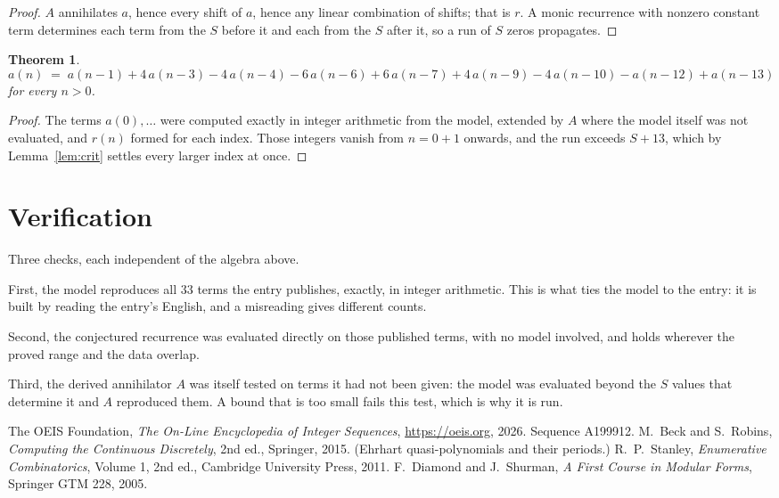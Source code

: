 \documentclass[11pt,a4paper]{article}
\theoremstyle{plain}
\newtheorem{theorem}{Theorem}
\theoremstyle{definition}
\begin{document}
\begin{proof}
$A$ annihilates $a$, hence every shift of $a$, hence any linear combination of shifts; that is
$r$. A monic recurrence with nonzero constant term determines each term from the $S$ before it
and each from the $S$ after it, so a run of $S$ zeros propagates.
\end{proof}

\begin{theorem}
\[
a(n)\;=\;a(n-1) + 4\,a(n-3) - 4\,a(n-4) - 6\,a(n-6) + 6\,a(n-7) + 4\,a(n-9) - 4\,a(n-10) - a(n-12) + a(n-13)
\]
for every $n>0$.
\end{theorem}

\begin{proof}
The terms $a(0),\dots$ were computed exactly in integer arithmetic from the model, extended by
$A$ where the model itself was not evaluated, and $r(n)$ formed for each index. Those integers
vanish from $n=0+1$ onwards, and the run exceeds $S+13$, which by
Lemma~\ref{lem:crit} settles every larger index at once.
\end{proof}

\section{Verification}

Three checks, each independent of the algebra above.

First, the model reproduces all $33$ terms the entry publishes, exactly, in integer
arithmetic. This is what ties the model to the entry: it is built by reading the entry's
English, and a misreading gives different counts.

Second, the conjectured recurrence was evaluated directly on those published terms, with no
model involved, and holds wherever the proved range and the data overlap.

Third, the derived annihilator $A$ was itself tested on terms it had not been given: the model
was evaluated beyond the $S$ values that determine it and $A$ reproduced them. A bound that is
too small fails this test, which is why it is run.

\begin{thebibliography}{9}
 The OEIS Foundation, \emph{The On-Line Encyclopedia of Integer
Sequences}, \url{https://oeis.org}, 2026. Sequence A199912.
 M.~Beck and S.~Robins, \emph{Computing the Continuous Discretely},
2nd ed., Springer, 2015. (Ehrhart quasi-polynomials and their periods.)
 R.~P.~Stanley, \emph{Enumerative Combinatorics}, Volume 1, 2nd ed.,
Cambridge University Press, 2011.
 F.~Diamond and J.~Shurman, \emph{A First Course in Modular Forms},
Springer GTM 228, 2005.
\end{thebibliography}
\end{document}
